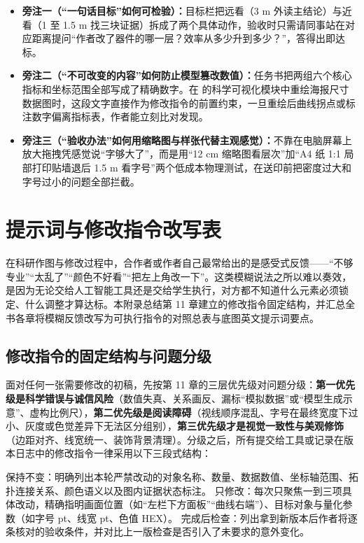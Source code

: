 \begin{itemize}
  \item \textbf{旁注一（“一句话目标”如何可检验）：}目标栏把远看（3 m 外读主结论）与近看（1 至 1.5 m 找三块证据）拆成了两个具体动作，验收时只需请同事站在对应距离提问“作者改了器件的哪一层？效率从多少升到多少？”，答得出即达标。
  \item \textbf{旁注二（“不可改变的内容”如何防止模型篡改数值）：}任务书把两组六个核心指标和坐标范围全部写成了精确数字。在 \scidraw{} 的科学可视化模块中重绘海报尺寸数据图时，这段文字直接作为修改指令的前置约束，一旦重绘后曲线拐点或标注数字偏离指标表，作者能立刻比对发现。
  \item \textbf{旁注三（“验收办法”如何用缩略图与样张代替主观感觉）：}不靠在电脑屏幕上放大拖拽凭感觉说“字够大了”，而是用“12 cm 缩略图看层次”加“A4 纸 1:1 局部打印贴墙退后 1.5 m 看字号”两个低成本物理测试，在送印前把密度过大和字号过小的问题全部拦截。
\end{itemize}

\chapter{提示词与修改指令改写表}
\label{app:prompt-rewrites}

在科研作图与修改过程中，合作者或作者自己最常给出的是感受式反馈——“不够专业”“太乱了”“颜色不好看”“把左上角改一下”。这类模糊说法之所以难以奏效，是因为无论交给人工智能工具还是交给学生执行，对方都不知道什么元素必须锁定、什么调整才算达标。本附录总结第 11 章建立的修改指令固定结构，并汇总全书各章将模糊反馈改写为可执行指令的对照总表与底图英文提示词要点。

\section{修改指令的固定结构与问题分级}

面对任何一张需要修改的初稿，先按第 11 章的三层优先级对问题分级：\textbf{第一优先级是科学错误与诚信风险}（数值失真、关系画反、漏标“模拟数据”或“模型生成示意”、虚构比例尺），\textbf{第二优先级是阅读障碍}（视线顺序混乱、字号在最终宽度下过小、灰度或色觉差异下无法区分组别），\textbf{第三优先级才是视觉一致性与美观修饰}（边距对齐、线宽统一、装饰背景清理）。分级之后，所有提交给工具或记录在版本日志中的修改指令一律采用以下三段式结构：

\begin{Prompt}
保持不变：明确列出本轮严禁改动的对象名称、数量、数据数值、坐标轴范围、拓扑连接关系、颜色语义以及图内证据状态标注。
只修改：每次只聚焦一到三项具体改动，精确指明画面位置（如“左栏下方面板”“曲线右端”）、目标对象与量化参数（如字号 pt、线宽 pt、色值 HEX）。
完成后检查：列出拿到新版本后作者将逐条核对的验收条件，并对比上一版检查是否引入了未要求的意外变化。
\end{Prompt}

